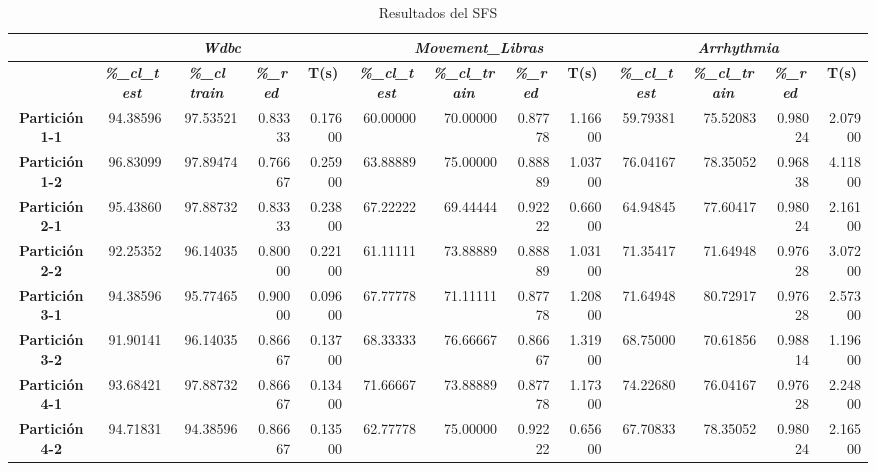 \documentclass[a4paper,11pt]{article}
\begin{document}
   \begin{table}[H]	
    \caption*{Resultados del SFS}
    \begin{adjustbox}{width=1.1\textwidth}
    \begin{tabular}{|c|r|r|r|r|r|r|r|r|r|r|r|r|}
    \hline
    \multicolumn{1}{|l|}{} & \multicolumn{ 4}{c|}{\textbf{\textit{Wdbc}}} & \multicolumn{ 4}{c|}{\textbf{\textit{Movement\_Libras}}} & \multicolumn{ 4}{c|}{\textbf{\textit{Arrhythmia}}} \\ \hline
    \multicolumn{1}{|l|}{} & \multicolumn{1}{c|}{\textbf{\textit{\%\_cl\_test}}} & \multicolumn{1}{c|}{\textbf{\textit{\%\_cl train}}} & \multicolumn{1}{c|}{\textbf{\textit{\%\_red}}} & \multicolumn{1}{c|}{\textbf{T(s)}} & \multicolumn{1}{c|}{\textbf{\textit{\%\_cl\_test}}} & \multicolumn{1}{c|}{\textbf{\textit{\%\_cl\_train}}} & \multicolumn{1}{c|}{\textbf{\textit{\%\_red}}} & \multicolumn{1}{c|}{\textbf{T(s)}} & \multicolumn{1}{c|}{\textbf{\textit{\%\_cl\_test}}} & \multicolumn{1}{c|}{\textbf{\textit{\%\_cl\_train}}} & \multicolumn{1}{c|}{\textbf{\textit{\%\_red}}} & \multicolumn{1}{c|}{\textbf{T(s)}} \\ \hline
    \textbf{Partición 1-1} & 94.38596 & 97.53521 & 0.83333 & 0.17600 & 60.00000 & 70.00000 & 0.87778 & 1.16600 & 59.79381 & 75.52083 & 0.98024 & 2.07900 \\ \hline
    \textbf{Partición 1-2} & 96.83099 & 97.89474 & 0.76667 & 0.25900 & 63.88889 & 75.00000 & 0.88889 & 1.03700 & 76.04167 & 78.35052 & 0.96838 & 4.11800 \\ \hline
    \textbf{Partición 2-1} & 95.43860 & 97.88732 & 0.83333 & 0.23800 & 67.22222 & 69.44444 & 0.92222 & 0.66000 & 64.94845 & 77.60417 & 0.98024 & 2.16100 \\ \hline
    \textbf{Partición 2-2} & 92.25352 & 96.14035 & 0.80000 & 0.22100 & 61.11111 & 73.88889 & 0.88889 & 1.03100 & 71.35417 & 71.64948 & 0.97628 & 3.07200 \\ \hline
    \textbf{Partición 3-1} & 94.38596 & 95.77465 & 0.90000 & 0.09600 & 67.77778 & 71.11111 & 0.87778 & 1.20800 & 71.64948 & 80.72917 & 0.97628 & 2.57300 \\ \hline
    \textbf{Partición 3-2} & 91.90141 & 96.14035 & 0.86667 & 0.13700 & 68.33333 & 76.66667 & 0.86667 & 1.31900 & 68.75000 & 70.61856 & 0.98814 & 1.19600 \\ \hline
    \textbf{Partición 4-1} & 93.68421 & 97.88732 & 0.86667 & 0.13400 & 71.66667 & 73.88889 & 0.87778 & 1.17300 & 74.22680 & 76.04167 & 0.97628 & 2.24800 \\ \hline
    \textbf{Partición 4-2} & 94.71831 & 94.38596 & 0.86667 & 0.13500 & 62.77778 & 75.00000 & 0.92222 & 0.65600 & 67.70833 & 78.35052 & 0.98024 & 2.16500 \\ \hline

\end{tabular}
\end{adjustbox}
\end{table}
\end{document}

